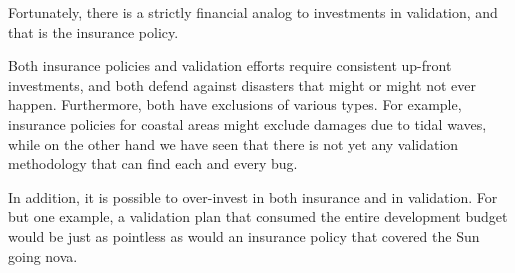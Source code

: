 Fortunately, there is a strictly financial analog to investments in
validation, and that is the insurance policy.

Both insurance policies and validation efforts require consistent
up-front investments, and both defend against disasters that might
or might not ever happen.
Furthermore, both have exclusions of various types.
For example, insurance policies for coastal areas might exclude
damages due to tidal waves, while on the other hand we have seen
that there is not yet any validation methodology that can find
each and every bug.

In addition, it is possible to over-invest in both insurance and
in validation.
For but one example, a validation plan that consumed the entire
development budget would be just as pointless as would an insurance
policy that covered the Sun going nova.

